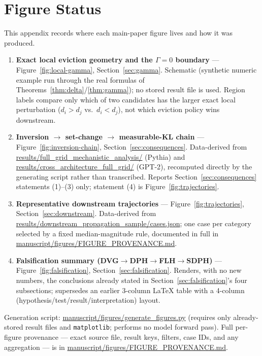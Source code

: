 \documentclass[11pt]{article}
\begin{document}
\appendix

\section{Figure Status}
\label{app:figures}

This appendix records where each main-paper figure lives and how it was
produced.

\begin{small}
\begin{enumerate}[nosep]
\item \textbf{Exact local eviction geometry and the $\Gamma=0$ boundary} ---
Figure~\ref{fig:local-gamma}, Section~\ref{sec:gamma}. Schematic (synthetic
numeric example run through the real formulas of
Theorems~\ref{thm:delta}/\ref{thm:gamma}); no stored result file is used.
Region labels compare only which of two candidates has the larger exact
local perturbation ($d_i>d_j$ vs.\ $d_i<d_j$), not which eviction policy
wins downstream.
\item \textbf{Inversion $\to$ set-change $\to$ measurable-KL chain} ---
Figure~\ref{fig:inversion-chain}, Section~\ref{sec:consequences}.
Data-derived from \url{results/full_grid_mechanistic_analysis/} (Pythia) and
\url{results/cross_architecture_full_grid/} (GPT-2), recomputed directly by
the generating script rather than transcribed. Reports Section~\ref{sec:consequences}
statements (1)--(3) only; statement (4) is Figure~\ref{fig:trajectories}.
\item \textbf{Representative downstream trajectories} ---
Figure~\ref{fig:trajectories}, Section~\ref{sec:downstream}. Data-derived
from \url{results/downstream_propagation_sample/cases.json}; one case per
category selected by a fixed median-magnitude rule, documented in full in
\url{manuscript/figures/FIGURE_PROVENANCE.md}.
\item \textbf{Falsification summary (DVG$\to$DPH$\to$FLH$\to$SDPH)} ---
Figure~\ref{fig:falsification}, Section~\ref{sec:falsification}. Renders,
with no new numbers, the conclusions already stated in
Section~\ref{sec:falsification}'s four subsections; supersedes an earlier
3-column LaTeX table with a 4-column (hypothesis/test/result/interpretation)
layout.
\end{enumerate}
\end{small}

Generation script: \url{manuscript/figures/generate_figures.py} (requires
only already-stored result files and \texttt{matplotlib}; performs no model
forward pass). Full per-figure provenance --- exact source file, result
keys, filters, case IDs, and any aggregation --- is in
\url{manuscript/figures/FIGURE_PROVENANCE.md}.
\end{document}

